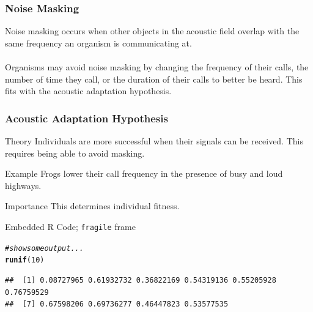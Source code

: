 \documentclass[12pt]{beamer}\usepackage[]{graphicx}\usepackage[]{color}
\makeatletter
\newcommand{\hlnum}[1]{\textcolor[rgb]{0.686,0.059,0.569}{#1}}%
\newcommand{\hlcom}[1]{\textcolor[rgb]{0.678,0.584,0.686}{\textit{#1}}}%
\newcommand{\hlstd}[1]{\textcolor[rgb]{0.345,0.345,0.345}{#1}}%
\newcommand{\hlkwd}[1]{\textcolor[rgb]{0.737,0.353,0.396}{\textbf{#1}}}%
\newenvironment{kframe}{%
 \def\at@end@of@kframe{}%
 \ifinner\ifhmode%
  \def\at@end@of@kframe{\end{minipage}}%
  \begin{minipage}{\columnwidth}%
 \fi\fi%
 \def\FrameCommand##1{\hskip\@totalleftmargin \hskip-\fboxsep
 \colorbox{shadecolor}{##1}\hskip-\fboxsep
     \hskip-\linewidth \hskip-\@totalleftmargin \hskip\columnwidth}%
 \MakeFramed {\advance\hsize-\width
   \@totalleftmargin\z@ \linewidth\hsize
   \@setminipage}}%
 {\par\unskip\endMakeFramed%
 \at@end@of@kframe}
\newenvironment{knitrout}{}{} %
\makeatother
\begin{document}
\begin{frame}
\frametitle{Noise Masking}
Noise masking occurs when other objects in the acoustic field overlap with the same frequency an organism is communicating at.\\~\\

Organisms may avoid noise masking by changing the frequency of their calls, the number of time they call, or the duration of their calls to better be heard. This fits with the acoustic adaptation hypothesis. 
\end{frame}

\begin{frame}
\frametitle{Acoustic Adaptation Hypothesis}
\begin{block}{Theory}
Individuals are more successful when their signals can be received. This requires being able to avoid masking.
\end{block}

\begin{block}{Example}
Frogs lower their call frequency in the presence of busy and loud highways.
\end{block}

\begin{block}{Importance}
This determines individual fitness.
\end{block}
\end{frame}

\begin{frame}[fragile]{Embedded R Code; \texttt{fragile} frame}
\begin{block}

\begin{knitrout}
\color{fgcolor}\begin{kframe}
\begin{alltt}
\hlcom{# show some output...}
\hlkwd{runif}\hlstd{(}\hlnum{10}\hlstd{)}
\end{alltt}
\begin{verbatim}
##  [1] 0.08727965 0.61932732 0.36822169 0.54319136 0.55205928 0.76759529
##  [7] 0.67598206 0.69736277 0.46447823 0.53577535
\end{verbatim}
\end{kframe}
\end{knitrout}

\end{block}
\end{frame}
\end{document}
